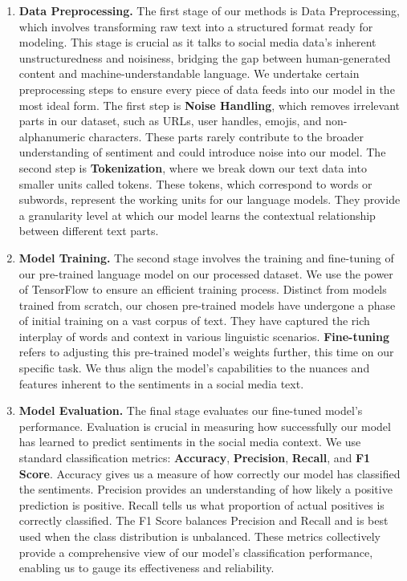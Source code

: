 \documentclass{article}
\begin{document}
\begin{enumerate}
    \item \textbf{Data Preprocessing.} The first stage of our methods is Data
          Preprocessing, which involves transforming raw text into a structured format
          ready for modeling. This stage is crucial as it talks to social media data's
          inherent unstructuredness and noisiness, bridging the gap between
          human-generated content and machine-understandable language. We undertake
          certain preprocessing steps to ensure every piece of data feeds into our model
          in the most ideal form. The first step is \textbf{Noise Handling}, which
          removes irrelevant parts in our dataset, such as URLs, user handles, emojis,
          and non-alphanumeric characters. These parts rarely contribute to the broader
          understanding of sentiment and could introduce noise into our model. The second
          step is \textbf{Tokenization}, where we break down our text data into smaller
          units called tokens. These tokens, which correspond to words or subwords,
          represent the working units for our language models. They provide a granularity
          level at which our model learns the contextual relationship between different
          text parts.

    \item \textbf{Model Training.} The second stage involves the training and
          fine-tuning of our pre-trained language model on our processed dataset. We use
          the power of TensorFlow to ensure an efficient training process. Distinct from
          models trained from scratch, our chosen pre-trained models have undergone a
          phase of initial training on a vast corpus of text. They have captured the rich
          interplay of words and context in various linguistic scenarios.
          \textbf{Fine-tuning} refers to adjusting this pre-trained model's weights
          further, this time on our specific task. We thus align the model's capabilities
          to the nuances and features inherent to the sentiments in a social media text.

    \item \textbf{Model Evaluation.} The final stage evaluates our fine-tuned
          model's performance. Evaluation is crucial in measuring how successfully our
          model has learned to predict sentiments in the social media context. We use
          standard classification metrics: \textbf{Accuracy}, \textbf{Precision},
          \textbf{Recall}, and \textbf{F1 Score}. Accuracy gives us a measure of how
          correctly our model has classified the sentiments. Precision provides an
          understanding of how likely a positive prediction is positive. Recall tells us
          what proportion of actual positives is correctly classified. The F1 Score
          balances Precision and Recall and is best used when the class distribution is
          unbalanced. These metrics collectively provide a comprehensive view of our
          model's classification performance, enabling us to gauge its effectiveness and
          reliability.
\end{enumerate}
\end{document}
